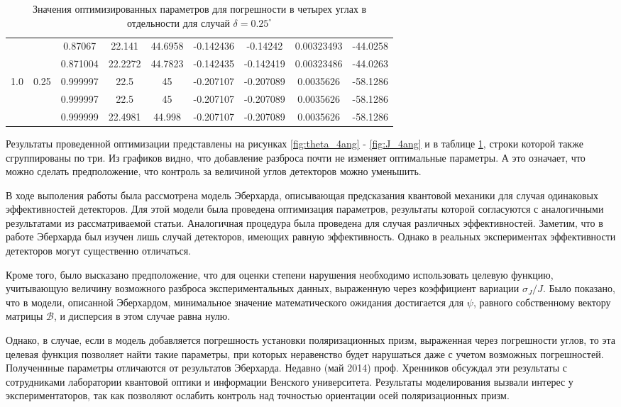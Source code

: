 \documentclass[%
master,         %
subf,           %
href,           %
colorlinks=true %
]{disser}
\numberwithin{equation}{section}
\numberwithin{figure}{section}
\begin{document}
\begin{table}
\begin{tabular}{|c|c|c|c|c|c|c|c|c|}
 &  & 0.87067 & 22.141 & 44.6958 & -0.142436 & -0.14242 & 0.00323493 & -44.0258\\\cline{3-9}
 &  & 0.871004 & 22.2272 & 44.7823 & -0.142435 & -0.142419 & 0.00323486 & -44.0263\\\hline
\multirow{3}{*}{1.0} & \multirow{3}{*}{0.25} & 0.999997 & 22.5 & 45 & -0.207107 & -0.207089 & 0.0035626 & -58.1286\\\cline{3-9}
 &  & 0.999997 & 22.5 & 45 & -0.207107 & -0.207089 & 0.0035626 & -58.1286\\\cline{3-9}
 &  & 0.999999 & 22.4981 & 44.998 & -0.207107 & -0.207089 & 0.0035626 & -58.1286\\\hline
 \end{tabular}
\caption{Значения оптимизированных параметров для погрешности в четырех углах в отдельности для случай $\delta = 0.25^\circ$}
\label{tab:different_deltas}
\end{table}


Результаты проведенной оптимизации представлены на рисунках \ref{fig:theta_4ang} - \ref{fig:J_4ang} и в таблице \ref{tab:different_deltas}, строки которой также сгруппированы по три. Из графиков видно, что добавление разброса почти не изменяет оптимальные параметры. А это означает, что можно сделать предположение, что контроль за величиной углов детекторов можно уменьшить. 

\conclusion
В ходе выполения работы была рассмотрена модель Эберхарда, описывающая предсказания квантовой механики для случая одинаковых эффективностей детекторов. Для этой модели была проведена оптимизация параметров, результаты которой согласуются с аналогичными результатами из рассматриваемой статьи. Аналогичная процедура была проведена для случая различных эффективностей. Заметим, что в работе Эберхарда был изучен лишь случай детекторов, имеющих равную эффективность. Однако в реальных экспериментах эффективности детекторов могут существенно отличаться.

Кроме того, было высказано предположение, что для оценки степени нарушения необходимо использовать целевую функцию, учитывающую величину возможного разброса экспериментальных данных, выраженную через коэффициент вариации $\sigma_J / J$. Было показано, что в модели, описанной Эберхардом, минимальное значение математического ожидания достигается для $\psi$, равного собственному вектору матрицы $\mathcal{B}$, и дисперсия в этом случае равна нулю.

Однако, в случае, если в модель добавляется погрешность установки поляризационных призм, выраженная через погрешности углов, то эта целевая функция позволяет найти такие параметры, при которых неравенство будет нарушаться даже с учетом возможных погрешностей. Полученнные параметры отличаются от результатов Эберхарда. Недавно (май 2014) проф. Хренников  обсуждал эти результаты с сотрудниками лаборатории квантовой оптики и информации Венского университета. Результаты моделирования вызвали интерес у экспериментаторов, так как позволяют ослабить контроль над точностью ориентации осей поляризационных призм.
\end{document}
